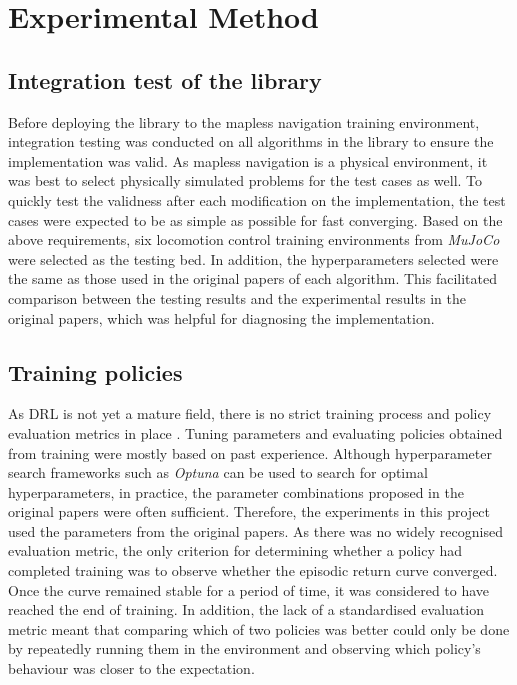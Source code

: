 \section{Experimental Method} \label{sec:method}

\subsection{Integration test of the library}

Before deploying the library to the mapless navigation training environment, integration testing was conducted on all algorithms in the library to ensure the implementation was valid. As mapless navigation is a physical environment, it was best to select physically simulated problems for the test cases as well. To quickly test the validness after each modification on the implementation, the test cases were expected to be as simple as possible for fast converging. Based on the above requirements, six locomotion control training environments from \textit{MuJoCo} were selected as the testing bed. In addition, the hyperparameters selected were the same as those used in the original papers of each algorithm. This facilitated comparison between the testing results and the experimental results in the original papers, which was helpful for diagnosing the implementation.

\subsection{Training policies}

As DRL is not yet a mature field, there is no strict training process and policy evaluation metrics in place \cite{ref:drl-that-matters}. Tuning parameters and evaluating policies obtained from training were mostly based on past experience. Although hyperparameter search frameworks such as \textit{Optuna} can be used to search for optimal hyperparameters, in practice, the parameter combinations proposed in the original papers were often sufficient. Therefore, the experiments in this project used the parameters from the original papers. As there was no widely recognised evaluation metric, the only criterion for determining whether a policy had completed training was to observe whether the episodic return curve converged. Once the curve remained stable for a period of time, it was considered to have reached the end of training. In addition, the lack of a standardised evaluation metric meant that comparing which of two policies was better could only be done by repeatedly running them in the environment and observing which policy's behaviour was closer to the expectation.

